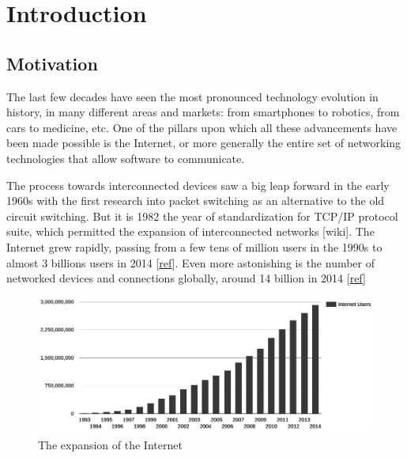 \chapter{Introduction}
\label{chap:introduction}

\section{Motivation}
The last few decades have seen the most pronounced technology evolution in history, in many different areas and markets: from smartphones to robotics, from cars to medicine, etc. One of the pillars upon which all these advancements have been made possible is the Internet, or more generally the entire set of networking technologies that allow software to communicate. 


The process towards interconnected devices saw a big leap forward in the early 1960s with the first research into packet switching as an alternative to the old circuit switching. But it is 1982 the year of standardization for TCP/IP protocol suite, which permitted the expansion of interconnected networks  [wiki]. The Internet grew rapidly, passing from a few tens of million users in the 1990s to almost 3 billions users in 2014 [\href{http://www.internetlivestats.com/internet-users}{ref}]. Even more astonishing is the number of networked devices and connections globally, around 14 billion in 2014 [\href{http://www.cisco.com/c/en/us/solutions/service-provider/visual-networking-index-vni/index.html#~complete-forecast}{ref}]

\begin{figure}[!htb]
\centering
\includegraphics[width=\textwidth]{images/internet_growth}
\caption{The expansion of the Internet}
\label{fig:networkscenario}
\end{figure}

